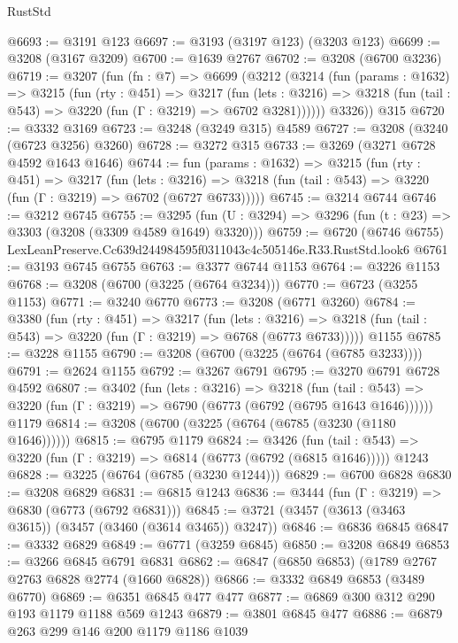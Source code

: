 \begin{lexlean}{RustStd}
\begin{coremodule}
@6693 := @3191 @123
@6697 := @3193 (@3197 @123) (@3203 @123)
@6699 := @3208 (@3167 @3209)
@6700 := @1639 @2767
@6702 := @3208 (@6700 @3236)
@6719 := @3207
    (fun (fn : @7) =>
    @6699
      (@3212
        (@3214
          (fun (params : @1632) =>
          @3215
            (fun (rty : @451) =>
            @3217
              (fun (lets : @3216) =>
              @3218 (fun (tail : @543) => @3220 (fun (Γ : @3219) => @6702 @3281))))))
        @3326))
    @315
@6720 := @3332 @3169
@6723 := @3248 (@3249 @315) @4589
@6727 := @3208 (@3240 (@6723 @3256) @3260)
@6728 := @3272 @315
@6733 := @3269 (@3271 @6728 @4592 @1643 @1646)
@6744 := fun (params : @1632) =>
  @3215
    (fun (rty : @451) =>
    @3217
      (fun (lets : @3216) =>
      @3218 (fun (tail : @543) => @3220 (fun (Γ : @3219) => @6702 (@6727 @6733)))))
@6745 := @3214 @6744
@6746 := @3212 @6745
@6755 := @3295 (fun (U : @3294) => @3296 (fun (t : @23) => @3303 (@3208 (@3309 @4589 @1649) @3320)))
@6759 := @6720 (@6746 @6755) LexLeanPreserve.Cc639d244984595f0311043c4c505146e.R33.RustStd.look6
@6761 := @3193 @6745 @6755
@6763 := @3377 @6744 @1153
@6764 := @3226 @1153
@6768 := @3208 (@6700 (@3225 (@6764 @3234)))
@6770 := @6723 (@3255 @1153)
@6771 := @3240 @6770
@6773 := @3208 (@6771 @3260)
@6784 := @3380
    (fun (rty : @451) =>
    @3217
      (fun (lets : @3216) =>
      @3218 (fun (tail : @543) => @3220 (fun (Γ : @3219) => @6768 (@6773 @6733)))))
    @1155
@6785 := @3228 @1155
@6790 := @3208 (@6700 (@3225 (@6764 (@6785 @3233))))
@6791 := @2624 @1155
@6792 := @3267 @6791
@6795 := @3270 @6791 @6728 @4592
@6807 := @3402
    (fun (lets : @3216) =>
    @3218
      (fun (tail : @543) => @3220 (fun (Γ : @3219) => @6790 (@6773 (@6792 (@6795 @1643 @1646))))))
    @1179
@6814 := @3208 (@6700 (@3225 (@6764 (@6785 (@3230 (@1180 @1646))))))
@6815 := @6795 @1179
@6824 := @3426
    (fun (tail : @543) => @3220 (fun (Γ : @3219) => @6814 (@6773 (@6792 (@6815 @1646)))))
    @1243
@6828 := @3225 (@6764 (@6785 (@3230 @1244)))
@6829 := @6700 @6828
@6830 := @3208 @6829
@6831 := @6815 @1243
@6836 := @3444 (fun (Γ : @3219) => @6830 (@6773 (@6792 @6831)))
@6845 := @3721 (@3457 (@3613 (@3463 @3615)) (@3457 (@3460 (@3614 @3465)) @3247))
@6846 := @6836 @6845
@6847 := @3332 @6829
@6849 := @6771 (@3259 @6845)
@6850 := @3208 @6849
@6853 := @3266 @6845 @6791 @6831
@6862 := @6847 (@6850 @6853) (@1789 @2767 @2763 @6828 @2774 (@1660 @6828))
@6866 := @3332 @6849 @6853 (@3489 @6770)
@6869 := @6351 @6845 @477 @477
@6877 := @6869 @300 @312 @290 @193 @1179 @1188 @569 @1243
@6879 := @3801 @6845 @477
@6886 := @6879 @263 @299 @146 @200 @1179 @1186 @1039

\end{coremodule}
\end{lexlean}
